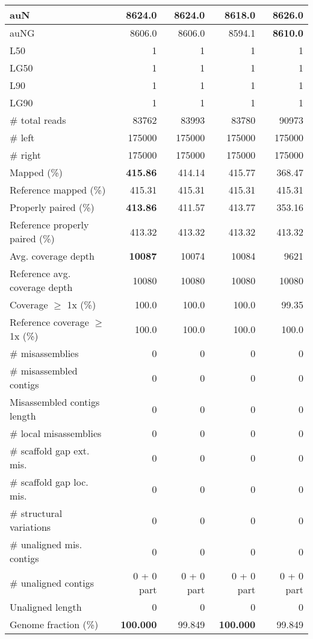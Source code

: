 \documentclass[12pt,a4paper]{article}
\begin{document}
\begin{table}[ht]
\begin{center}
\begin{tabular}{|l*{4}{|r}|}
auN & 8624.0 & 8624.0 & 8618.0 & {\bf 8626.0} \\ \hline
auNG & 8606.0 & 8606.0 & 8594.1 & {\bf 8610.0} \\ \hline
L50 & 1 & 1 & 1 & 1 \\ \hline
LG50 & 1 & 1 & 1 & 1 \\ \hline
L90 & 1 & 1 & 1 & 1 \\ \hline
LG90 & 1 & 1 & 1 & 1 \\ \hline
\# total reads & 83762 & 83993 & 83780 & 90973 \\ \hline
\# left & 175000 & 175000 & 175000 & 175000 \\ \hline
\# right & 175000 & 175000 & 175000 & 175000 \\ \hline
Mapped (\%) & {\bf 415.86} & 414.14 & 415.77 & 368.47 \\ \hline
Reference mapped (\%) & 415.31 & 415.31 & 415.31 & 415.31 \\ \hline
Properly paired (\%) & {\bf 413.86} & 411.57 & 413.77 & 353.16 \\ \hline
Reference properly paired (\%) & 413.32 & 413.32 & 413.32 & 413.32 \\ \hline
Avg. coverage depth & {\bf 10087} & 10074 & 10084 & 9621 \\ \hline
Reference avg. coverage depth & 10080 & 10080 & 10080 & 10080 \\ \hline
Coverage $\geq$ 1x (\%) & 100.0 & 100.0 & 100.0 & 99.35 \\ \hline
Reference coverage $\geq$ 1x (\%) & 100.0 & 100.0 & 100.0 & 100.0 \\ \hline
\# misassemblies & 0 & 0 & 0 & 0 \\ \hline
\# misassembled contigs & 0 & 0 & 0 & 0 \\ \hline
Misassembled contigs length & 0 & 0 & 0 & 0 \\ \hline
\# local misassemblies & 0 & 0 & 0 & 0 \\ \hline
\# scaffold gap ext. mis. & 0 & 0 & 0 & 0 \\ \hline
\# scaffold gap loc. mis. & 0 & 0 & 0 & 0 \\ \hline
\# structural variations & 0 & 0 & 0 & 0 \\ \hline
\# unaligned mis. contigs & 0 & 0 & 0 & 0 \\ \hline
\# unaligned contigs & 0 + 0 part & 0 + 0 part & 0 + 0 part & 0 + 0 part \\ \hline
Unaligned length & 0 & 0 & 0 & 0 \\ \hline
Genome fraction (\%) & {\bf 100.000} & 99.849 & {\bf 100.000} & 99.849 \\ \hline

\end{tabular}
\end{center}
\end{table}
\end{document}
